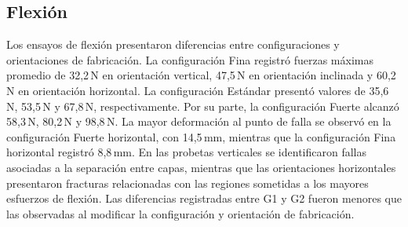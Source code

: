 \documentclass[10pt,twocolumn]{article}
\begin{document}
\subsection{Flexión}
Los ensayos de flexión presentaron diferencias entre configuraciones y orientaciones de fabricación. La configuración Fina registró fuerzas máximas promedio de 32,2\,N en orientación vertical, 47,5\,N en orientación inclinada y 60,2\,N en orientación horizontal. La configuración Estándar presentó valores de 35,6\,N, 53,5\,N y 67,8\,N, respectivamente. Por su parte, la configuración Fuerte alcanzó 58,3\,N, 80,2\,N y 98,8\,N. La mayor deformación al punto de falla se observó en la configuración Fuerte horizontal, con 14,5\,mm, mientras que la configuración Fina horizontal registró 8,8\,mm. En las probetas verticales se identificaron fallas asociadas a la separación entre capas, mientras que las orientaciones horizontales presentaron fracturas relacionadas con las regiones sometidas a los mayores esfuerzos de flexión. Las diferencias registradas entre G1 y G2 fueron menores que las observadas al modificar la configuración y orientación de fabricación.
\end{document}
